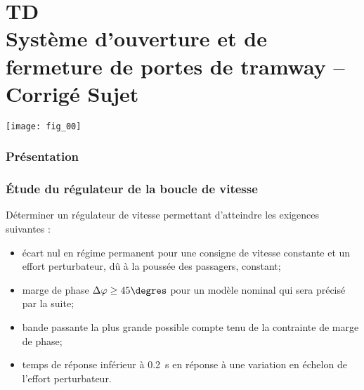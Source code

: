 \chapter*{TD  \\ 
Système d’ouverture et de fermeture de portes de tramway -- 
\ifprof Corrigé \else Sujet \fi}

\iflivret {} \else
\ifprof  {} \else \fi
\fi

\setcounter{question}{0}

\begin{marginfigure}[4cm]
\centering
\texttt{[image: fig\_00]}
\end{marginfigure}

\subsection*{Présentation}

\subsection*{Étude du régulateur de la boucle de vitesse}

\begin{obj}Déterminer un régulateur de vitesse permettant d’atteindre les exigences
suivantes :
\begin{itemize}
\item écart nul en régime permanent pour une consigne de vitesse constante et un effort perturbateur, dû à la poussée des passagers, constant;
\item marge de phase $\Delta \varphi \geq 45\degres$ pour un modèle nominal qui sera précisé par la suite;
\item bande passante la plus grande possible compte tenu de la contrainte de marge de phase;
\item temps de réponse inférieur à \SI{0,2}{s} en réponse à une variation en échelon de l’effort perturbateur.
\end{itemize}
\end{obj}


